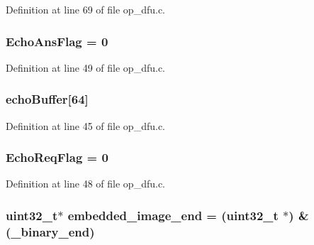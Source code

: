 Definition at line 69 of file op\-\_\-dfu.\-c.

\hypertarget{group___open_pilot_b_l_ga80f6f95b1bc0667183dbf26b5439a289}{
\subsubsection[{Echo\-Ans\-Flag}]{ Echo\-Ans\-Flag = 0}}\label{group___open_pilot_b_l_ga80f6f95b1bc0667183dbf26b5439a289}


Definition at line 49 of file op\-\_\-dfu.\-c.

\hypertarget{group___open_pilot_b_l_ga7dd4853474086e75f278ea07c2f0b506}{
\subsubsection[{echo\-Buffer}]{ echo\-Buffer\mbox{[}64\mbox{]}}}\label{group___open_pilot_b_l_ga7dd4853474086e75f278ea07c2f0b506}


Definition at line 45 of file op\-\_\-dfu.\-c.

\hypertarget{group___open_pilot_b_l_gaeda788a6eac8e2e01a62eb1f62627c8e}{
\subsubsection[{Echo\-Req\-Flag}]{ Echo\-Req\-Flag = 0}}\label{group___open_pilot_b_l_gaeda788a6eac8e2e01a62eb1f62627c8e}


Definition at line 48 of file op\-\_\-dfu.\-c.

\hypertarget{group___open_pilot_b_l_ga8b1e4a9a16473320612d8461c4d887b9}{
\subsubsection[{embedded\-\_\-image\-\_\-end}]{ {\bf uint32\-\_\-t}$\ast$ embedded\-\_\-image\-\_\-end = ({\bf uint32\-\_\-t} $\ast$) \&({\bf \-\_\-binary\-\_\-end})}}\label{group___open_pilot_b_l_ga8b1e4a9a16473320612d8461c4d887b9}


